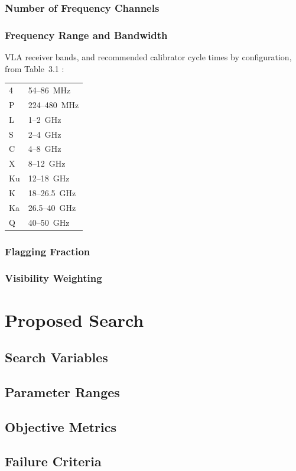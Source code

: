 \documentclass[11pt]{article}
\begin{document}
\subsubsection{Number of Frequency Channels}

\subsubsection{Frequency Range and Bandwidth}

VLA receiver bands, and recommended calibrator cycle times by configuration, from Table~3.1 \cite{nrao-vla-obsguide}:
\begin{center}
\begin{tabular}{ll}
4  & 54--86~MHz \\
P  & 224--480~MHz \\
L  & 1--2~GHz \\
S  & 2--4~GHz \\
C  & 4--8~GHz \\
X  & 8--12~GHz \\
Ku & 12--18~GHz \\
K  & 18--26.5~GHz \\
Ka & 26.5--40~GHz \\
Q  & 40--50~GHz \\
\end{tabular}
\end{center}

\subsubsection{Flagging Fraction}

\subsubsection{Visibility Weighting}

\section{Proposed Search}

\subsection{Search Variables}

\subsection{Parameter Ranges}

\subsection{Objective Metrics}

\subsection{Failure Criteria}

\nocite{*}


\end{document}

